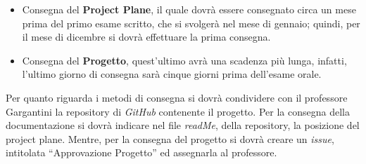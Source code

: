 \documentclass{book}
\begin{document}
    \begin{itemize}
        \item Consegna del \textbf{Project Plane}, il quale dovrà essere consegnato circa un mese prima del primo esame scritto, che si svolgerà nel mese di gennaio; quindi, per il mese di dicembre si dovrà effettuare la prima consegna.
        \item Consegna del \textbf{Progetto}, quest'ultimo avrà una scadenza più lunga, infatti, l'ultimo giorno di consegna sarà cinque giorni prima dell'esame orale.
    \end{itemize}
    Per quanto riguarda i metodi di consegna si dovrà condividere con il professore Gargantini la repository di \textit{GitHub} contenente il progetto. Per la consegna della documentazione si dovrà indicare nel file \textit{readMe}, della repository, la posizione del project plane. Mentre, per la consegna del progetto si dovrà creare un \textit{issue}, intitolata “Approvazione Progetto” ed assegnarla al professore.


\end{document}
